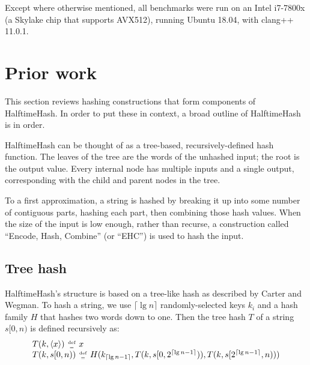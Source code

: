 \documentclass{llncs}
\newcommand{\nats}{\mathbb{N}}
\newcommand{\defeq}{\;\genfrac{}{}{0pt}{2}{\text{def}}{=}\;}
\begin{document}
Except where otherwise mentioned, all benchmarks were run on an Intel i7-7800x (a Skylake chip that supports AVX512), running Ubuntu 18.04, with clang++ 11.0.1.

\section{Prior work}
\label{prior-work}


This section reviews hashing constructions that form components of HalftimeHash.
In order to put these in context, a broad outline of HalftimeHash is in order.

HalftimeHash can be thought of as a tree-based, recursively-defined hash function.
The leaves of the tree are the words of the unhashed input; the root is the output value.
Every internal node has multiple inputs and a single output, corresponding with the child and parent nodes in the tree.

To a first approximation, a string is hashed by breaking it up into some number of contiguous parts, hashing each part, then combining those hash values.
When the size of the input is low enough, rather than recurse, a construction called ``Encode, Hash, Combine'' (or ``EHC'') is used to hash the input.


\subsection{Tree hash}

HalftimeHash's structure is based on a tree-like hash as described by Carter and Wegman. \cite[Section 3]{carter-wegman-79}
To hash a string, we use $\lceil \lg n \rceil$ randomly-selected keys $k_i$ and a hash family $H$ that hashes two words down to one.
Then the tree hash $T$ of a string $s[0,n)$ is defined recursively as:
\begin{equation}
\label{algebraic-badger}
\begin{array}{l}
T(k, \langle x \rangle) \defeq x \\
T(k, s[0,n)) \defeq H
(k_{  \lceil \lg n - 1 \rceil},
T(k, s[0, 2^{\lceil \lg n - 1 \rceil}) ),
T(k, s[ 2^{\lceil \lg n - 1 \rceil}, n) ))
\end{array}
\end{equation}
\end{document}
